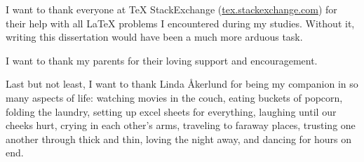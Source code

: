 \begin{acknowledgements}
  I want to thank everyone at \TeX{} StackExchange
  ({\url{tex.stackexchange.com}}) for their help with all
  \LaTeX{} problems I encountered during my studies.
  Without it, writing this dissertation would have been a much more arduous
  task.

  I want to thank my parents for their loving support and encouragement.

  Last but not least, I want to thank Linda \r{A}kerlund for being my companion
  in so many aspects of life: watching movies in the couch, eating buckets of
  popcorn, folding the laundry, setting up excel sheets for everything, laughing
  until our cheeks hurt, crying in each other's arms, traveling to faraway
  places, trusting one another through thick and thin, loving the night away,
  and dancing for hours on end.
\end{acknowledgements}
